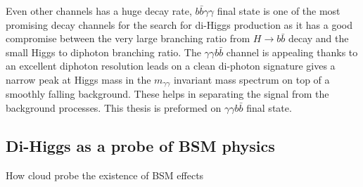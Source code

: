Even other channels has a huge decay rate, $b\bar{b}\gamma\gamma$ final state is one of the most promising decay channels for the search for di-Higgs production as it has a good compromise between the very large branching ratio from $H\rightarrow b\bar{b}$ decay and the small Higgs to diphoton branching ratio. The $\gamma\gamma b\bar{b}$ channel is appealing thanks to an excellent diphoton resolution leads on a clean di-photon signature gives a narrow peak at Higgs mass in the $m_{\gamma\gamma}$ invariant mass spectrum
on top of a smoothly falling background. These helps in separating the signal from the background processes. This thesis is preformed on $\gamma\gamma b\bar{b}$ final state.
\subsection{Di-Higgs as a probe of BSM physics}
\label{chap1:HH:BSM}
How \kl cloud probe the existence of BSM effects

